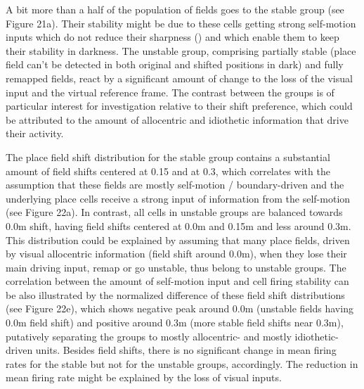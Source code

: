 A bit more than a half of the population of fields goes to the stable group (see Figure 21a). Their stability might be due to these cells getting strong self-motion inputs which do not reduce their sharpness (\cite{Allen2016}) and which enable them to keep their stability in darkness. The unstable group, comprising partially stable (place field can’t be detected in both original and shifted positions in dark) and fully remapped fields, react by a significant amount of change to the loss of the visual input and the virtual reference frame.  The contrast between the groups is of  particular interest for investigation relative to their shift preference, which could be attributed to the amount of allocentric and idiothetic information that drive their activity.

The place field shift distribution for the stable group contains a substantial amount of field shifts centered at 0.15 and at 0.3, which correlates with the assumption that these fields are mostly self-motion / boundary-driven and the underlying place cells receive a strong input of information from the self-motion (see Figure 22a). In contrast, all cells in unstable groups are balanced towards 0.0m shift, having field shifts centered at 0.0m and 0.15m and less around 0.3m. This distribution could be explained by assuming that many place fields, driven by visual allocentric information (field shift around 0.0m), when they lose their main driving input, remap or go unstable, thus belong to unstable groups. The correlation between the amount of self-motion input and cell firing stability can be also illustrated by the normalized difference of these field shift distributions (see Figure 22e), which shows negative peak around 0.0m (unstable fields having 0.0m field shift) and positive around 0.3m (more stable field shifts near 0.3m), putatively separating the groups to mostly allocentric- and mostly idiothetic- driven units. Besides field shifts, there is no significant change in mean firing rates for the stable but not for the unstable groups, accordingly. The reduction in mean firing rate might be explained by the loss of visual inputs.

